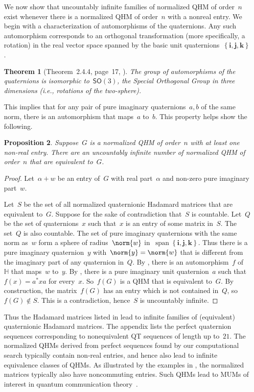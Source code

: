 \documentclass[12pt]{article}
\numberwithin{equation}{section}
\newtheorem{theorem}{Theorem}
\newtheorem{proposition}[theorem]{Proposition}
\newcommand{\qi}{\mathbf{i}}
\newcommand{\qj}{\mathbf{j}}
\newcommand{\qk}{\mathbf{k}}
\newcommand{\HH}{\mathbb{H}}
\newcommand{\set}[1]{\left\{ #1 \right\}}
\newcommand{\so}{\mathsf{SO}}
\DeclareMathOperator{\Span}{span}
\begin{document}
We now show that uncountably infinite families of normalized QHM of order~$n$ exist whenever there is a normalized QHM of order~$n$ with a nonreal entry.
We begin with a characterization of automorphisms of the quaternions.
Any such automorphism corresponds to an orthogonal transformation (more specifically, a rotation)
in the real vector space spanned by the basic unit quaternions~$\set{\qi, \qj, \qk}$. 
\begin{theorem}[Theorem~2.4.4, page~17, \cite{Rodman14-quaternion-linear-algebra}]
\label{thm-automorphism}
The group of automorphisms of the quaternions is isomorphic to~$\so(3)$, the Special Orthogonal Group in three dimensions (i.e., rotations of the two-sphere).
\end{theorem}
This implies that for any pair of pure imaginary quaternions~$a,b$ of the same norm, there is an automorphism that maps~$a$ to~$b$. This property helps show the following.
\begin{proposition}
\label{prop-infinite-family}
Suppose~$G$ is a normalized QHM of order~$n$ with at least one non-real entry. There are an uncountably infinite number of normalized QHM of order~$n$ that are equivalent to~$G$.
\end{proposition}
\begin{proof}
Let~$\alpha + w$ be an entry of~$G$ with real part~$\alpha$ and non-zero pure imaginary part~$w$.

Let~$S$ be the set of all normalized quaternionic Hadamard matrices that are equivalent to~$G$. Suppose for the sake of contradiction that~$S$ is countable. Let~$Q$ be the set of quaternions~$x$ such that~$x$ is an entry of some matrix in~$S$. The set~$Q$ is also countable. The set of pure imaginary quaternions with the same norm as~$w$ form a sphere of radius~$\norm{w}$ in~$ \Span\set{\qi, \qj, \qk}$. Thus there is a pure imaginary quaternion~$y$ with~$\norm{y} = \norm{w}$ that is different from the imaginary part of any quaternion in~$Q$. By , there is an automorphism~$f$ of~$\HH$ that maps~$w$ to~$y$. By , there is a pure imaginary unit quaternion~$a$ such that~$f(x) = a^* x a$ for every~$x$. So~$f(G)$ is a QHM that is equivalent to~$G$. By construction, the matrix~$f(G)$ has an entry which is not contained in~$Q$, so~$f(G) \not\in S$. This is a contradiction, hence~$S$ is uncountably infinite.
\end{proof}
Thus the Hadamard matrices listed in  lead to infinite families of (equivalent) quaternionic Hadamard matrices. 
The appendix lists the perfect quaternion sequences corresponding to nonequivalent QT sequences of length up to~$21$.
The normalized QHMs derived from perfect sequences found by our computational search typically contain non-real entries, and hence also lead to infinite equivalence classes of QHMs.
As illustrated by the examples in , the normalized matrices typically also have noncommuting entries.
Such QHMs lead to MUMs of interest in quantum communication theory~\cite{FKN23-mum-superdense-coding}.
\end{document}
